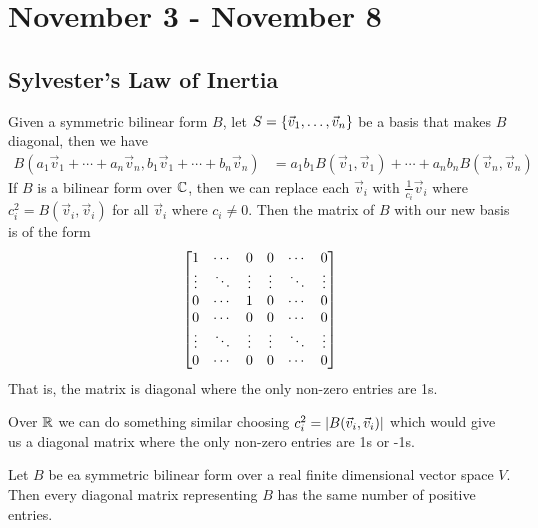 \chapter{November 3 - November 8}

\section{Sylvester's Law of Inertia}

\begin{remark}
  Given a symmetric bilinear form $B$, let $S = \left\{\vec v_1,\ldots,\vec v_n\right\}$ be a basis that makes $B$ diagonal, then we have
  \begin{align}
    B(a_1\vec v_1 + \cdots + a_n\vec v_n, b_1\vec v_1 + \cdots + b_n\vec v_n)
      &= a_1b_1B(\vec v_1,\vec v_1) + \cdots + a_nb_nB(\vec v_n, \vec v_n)
  \end{align}
  If $B$ is a bilinear form over $\mathbb{C}$, then we can replace each $\vec v_i$ with $\frac{1}{c_i}\vec v_i$ where $c_i^2 = B(\vec v_i, \vec v_i)$
    for all $\vec v_i$ where $c_i \ne 0$. Then the matrix of $B$ with our new basis is of the form
  \begin{align}
    \begin{bmatrix}
      1 & \cdots & 0 & 0 & \cdots & 0 \\
      \vdots & \ddots & \vdots & \vdots & \ddots & \vdots \\
      0 & \cdots & 1 & 0 & \cdots & 0 \\
      0 & \cdots & 0 & 0 & \cdots & 0 \\
      \vdots & \ddots & \vdots & \vdots & \ddots & \vdots \\
      0 & \cdots & 0 & 0 & \cdots & 0
    \end{bmatrix}
  \end{align}
  That is, the matrix is diagonal where the only non-zero entries are 1s.
\end{remark}

\begin{remark}
  Over $\mathbb{R}$ we can do something similar choosing $c_i^2 = \left|B(\vec v_i, \vec v_i)\right|$ which would give us a diagonal matrix
  where the only non-zero entries are 1s or -1s.
\end{remark}

\begin{theorem}
  Let $B$ be ea symmetric bilinear form over a real finite dimensional vector space $V$.
  Then every diagonal matrix representing $B$ has the same number of positive entries.
\end{theorem}

